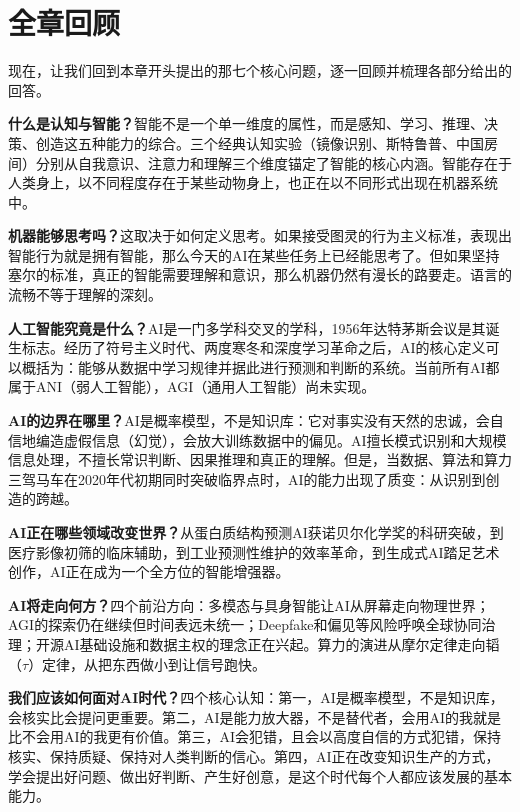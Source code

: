 \section*{全章回顾}

现在，让我们回到本章开头提出的那七个核心问题，逐一回顾并梳理各部分给出的回答。

\textbf{什么是认知与智能？}智能不是一个单一维度的属性，而是感知、学习、推理、决策、创造这五种能力的综合。三个经典认知实验（镜像识别、斯特鲁普、中国房间）分别从自我意识、注意力和理解三个维度锚定了智能的核心内涵。智能存在于人类身上，以不同程度存在于某些动物身上，也正在以不同形式出现在机器系统中。

\textbf{机器能够思考吗？}这取决于如何定义思考。如果接受图灵的行为主义标准，表现出智能行为就是拥有智能，那么今天的AI在某些任务上已经能思考了。但如果坚持塞尔的标准，真正的智能需要理解和意识，那么机器仍然有漫长的路要走。语言的流畅不等于理解的深刻。

\textbf{人工智能究竟是什么？}AI是一门多学科交叉的学科，1956年达特茅斯会议是其诞生标志。经历了符号主义时代、两度寒冬和深度学习革命之后，AI的核心定义可以概括为：能够从数据中学习规律并据此进行预测和判断的系统。当前所有AI都属于ANI（弱人工智能），AGI（通用人工智能）尚未实现。

\textbf{AI的边界在哪里？}AI是概率模型，不是知识库：它对事实没有天然的忠诚，会自信地编造虚假信息（幻觉），会放大训练数据中的偏见。AI擅长模式识别和大规模信息处理，不擅长常识判断、因果推理和真正的理解。但是，当数据、算法和算力三驾马车在2020年代初期同时突破临界点时，AI的能力出现了质变：从识别到创造的跨越。

\textbf{AI正在哪些领域改变世界？}从蛋白质结构预测AI获诺贝尔化学奖的科研突破，到医疗影像初筛的临床辅助，到工业预测性维护的效率革命，到生成式AI踏足艺术创作，AI正在成为一个全方位的智能增强器。

\textbf{AI将走向何方？}四个前沿方向：多模态与具身智能让AI从屏幕走向物理世界；AGI的探索仍在继续但时间表远未统一；Deepfake和偏见等风险呼唤全球协同治理；开源AI基础设施和数据主权的理念正在兴起。算力的演进从摩尔定律走向韬（$\tau$）定律，从把东西做小到让信号跑快。

\textbf{我们应该如何面对AI时代？}四个核心认知：第一，AI是概率模型，不是知识库，会核实比会提问更重要。第二，AI是能力放大器，不是替代者，会用AI的我就是比不会用AI的我更有价值。第三，AI会犯错，且会以高度自信的方式犯错，保持核实、保持质疑、保持对人类判断的信心。第四，AI正在改变知识生产的方式，学会提出好问题、做出好判断、产生好创意，是这个时代每个人都应该发展的基本能力。

